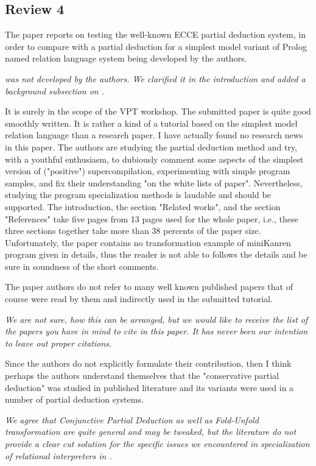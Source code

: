 
\subsection*{Review 4}

The paper reports on testing the well-known ECCE partial deduction system, in order to compare with a partial deduction for a simplest model variant of Prolog named relation language system being developed by the authors.

\emph{\mk was not developed by the authors. We clarified it in the introduction and added a background subsection on \mk. }

It is surely in the scope of the VPT workshop.
The submitted paper is quite good smoothly written.
It is rather a kind of a tutorial based on the simplest model relation language than a research paper.
I have actually found no research news in this paper.
The authors are studying the partial deduction method and try, with a youthful enthusiasm, to dubiously comment some aspects of the simplest version of ("positive") supercompilation, experimenting with simple program samples, and fix their understanding "on the white lists of paper".
Nevertheless, studying the program specialization methods is laudable and should be supported.
The introduction, the section "Related works", and the section "References" take five pages from 13 pages used for the whole paper, i.e., these three sections together take more than 38 percents of the paper size.
Unfortunately, the paper contains no transformation example of miniKanren program given in details, thus the reader is not able to follows the details and be sure in soundness of the short comments.


The paper authors do not refer to many well known published papers that of course were read by them and indirectly used in the submitted tutorial.

\emph{We are not sure, how this can be arranged, but we would like to receive the list of the papers you have in mind to cite in this paper. It has never been our intention to leave out proper citations.}

Since the authors do not explicitly formulate their contribution, then I think perhaps the authors understand themselves that the "conservative partial deduction" was studied in published literature and its variants were used in a number of partial deduction systems.

\emph{We agree that Conjunctive Partial Deduction as well as Fold-Unfold transformation are quite general and may be tweaked, but the literature do not provide a clear cut solution for the specific issues we encountered in specialization of relational interpreters in \mk.}

